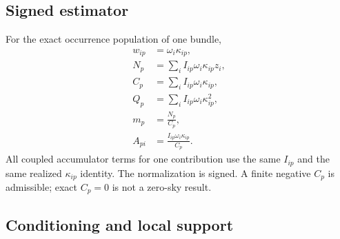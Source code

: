 \subsection{Signed estimator}
\label{sec:signed-estimator}

For the exact occurrence population of one bundle,
\begin{align}
  w_{ip} &= \omega_i\kappa_{ip},
    \label{eq:effective-coefficient}\\
  N_p &= \sum_i I_{ip}\omega_i\kappa_{ip}z_i,
    \label{eq:numerator}\\
  C_p &= \sum_i I_{ip}\omega_i\kappa_{ip},
    \label{eq:normalization}\\
  Q_p &= \sum_i I_{ip}\omega_i\kappa_{ip}^{2},
    \label{eq:quadratic}\\
  m_p &= \frac{N_p}{C_p},
    \label{eq:map-estimate}\\
  A_{pi} &= \frac{I_{ip}\omega_i\kappa_{ip}}{C_p}.
    \label{eq:operator}
\end{align}
All coupled accumulator terms for one contribution use the same $I_{ip}$ and
the same realized $\kappa_{ip}$ identity.  The normalization is signed.  A
finite negative $C_p$ is admissible; exact $C_p=0$ is not a zero-sky result.

\subsection{Conditioning and local support}
\label{sec:conditioning}

